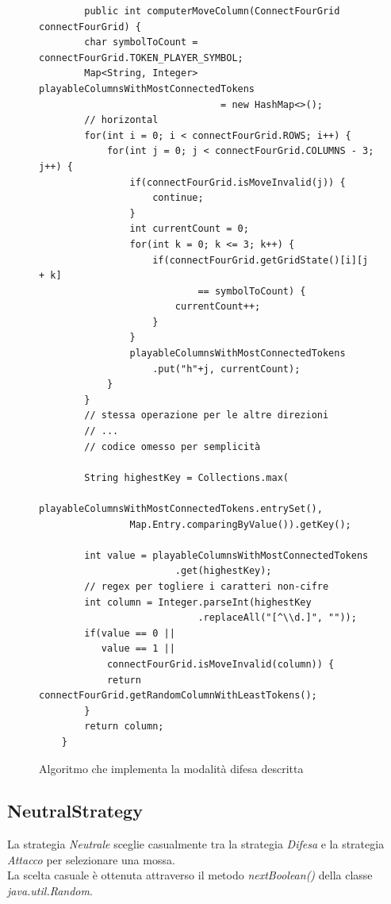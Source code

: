 \begin{figure}
    \centering
    \begin{verbatim}
        public int computerMoveColumn(ConnectFourGrid connectFourGrid) {
        char symbolToCount = connectFourGrid.TOKEN_PLAYER_SYMBOL;
        Map<String, Integer> playableColumnsWithMostConnectedTokens
                                = new HashMap<>();
        // horizontal
        for(int i = 0; i < connectFourGrid.ROWS; i++) {
            for(int j = 0; j < connectFourGrid.COLUMNS - 3; j++) {
                if(connectFourGrid.isMoveInvalid(j)) {
                    continue;
                }
                int currentCount = 0;
                for(int k = 0; k <= 3; k++) {
                    if(connectFourGrid.getGridState()[i][j + k]
                            == symbolToCount) {
                        currentCount++;
                    }
                }
                playableColumnsWithMostConnectedTokens
                    .put("h"+j, currentCount);
            }
        }
        // stessa operazione per le altre direzioni
        // ...
        // codice omesso per semplicità

        String highestKey = Collections.max(
                playableColumnsWithMostConnectedTokens.entrySet(),
                Map.Entry.comparingByValue()).getKey();

        int value = playableColumnsWithMostConnectedTokens
                        .get(highestKey);
        // regex per togliere i caratteri non-cifre
        int column = Integer.parseInt(highestKey
                            .replaceAll("[^\\d.]", ""));
        if(value == 0 ||
           value == 1 ||
            connectFourGrid.isMoveInvalid(column)) {
            return connectFourGrid.getRandomColumnWithLeastTokens();
        }
        return column;
    }
    \end{verbatim}
    \caption{Algoritmo che implementa la modalità difesa descritta}
    \label{fig:defense-strategy}
\end{figure}

\newpage
\subsection{NeutralStrategy}\label{subsec:neutralstrategy}

La strategia \textit{Neutrale} sceglie casualmente tra la strategia \textit{Difesa} e la strategia \textit{Attacco} per
selezionare una mossa. \\
La scelta casuale è ottenuta attraverso il metodo \textit{nextBoolean()} della classe \textit{java.util.Random}. \\


